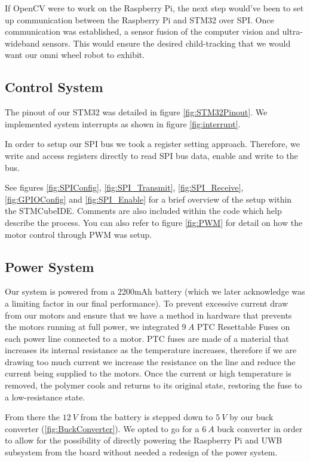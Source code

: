 \documentclass{report}
\begin{document}
If OpenCV were to work on the Raspberry Pi, the next step would’ve been to set up communication between the Raspberry Pi and STM32 over SPI. Once communication was established, a sensor fusion of the computer vision and ultra-wideband sensors. This would ensure the desired child-tracking that we would want our omni wheel robot to exhibit.

    \subsection{Control System}

    The pinout of our STM32 was detailed in figure \ref{fig:STM32Pinout}. We implemented system interrupts as shown in figure \ref{fig:interrupt}.

    In order to setup our SPI bus we took a register setting approach. Therefore, we write and access registers directly to read SPI bus data, enable and write to the bus. 
    
    See figures \ref{fig:SPIConfig}, \ref{fig:SPI_Transmit}, \ref{fig:SPI_Receive}, \ref{fig:GPIOConfig} and \ref{fig:SPI_Enable} for a brief overview of the setup within the STMCubeIDE. Comments are also included within the code which help describe the process. You can also refer to figure \ref{fig:PWM} for detail on how the motor control through PWM was setup.

    \subsection{Power System}
    Our system is powered from a 2200mAh battery (which we later acknowledge was a limiting factor in our final performance). To prevent excessive current draw from our motors and ensure that we have a method in hardware that prevents the motors running at full power, we integrated $9~A$ PTC Resettable Fuses on each power line connected to a motor. PTC fuses are made of a material that increases its internal resistance as the temperature increases, therefore if we are drawing too much current we increase the resistance on the line and reduce the current being supplied to the motors. Once the current or high temperature is removed, the polymer cools and returns to its original state, restoring the fuse to a low-resistance state.
    
    From there the $12~V$ from the battery is stepped down to $5~V$ by our buck converter (\ref{fig:BuckConverter}). We opted to go for a $6~A$ buck converter in order to allow for the possibility of directly powering the Raspberry Pi and UWB subsystem from the board without needed a redesign of the power system.
\end{document}

